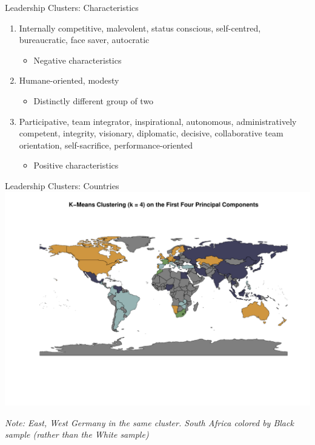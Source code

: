 \documentclass[
  ignorenonframetext,
]{beamer}
\providecommand{\tightlist}{%
  \setlength{\itemsep}{0pt}\setlength{\parskip}{0pt}}
\begin{document}
\begin{frame}{Leadership Clusters: Characteristics}
\protect\hypertarget{leadership-clusters-characteristics-1}{}

\begin{enumerate}
\item
  \textcolor{clust1}{Internally competitive, malevolent, status conscious, self-centred, bureaucratic, face saver, autocratic}

  \begin{itemize}
  \tightlist
  \item
    Negative characteristics
  \end{itemize}
\item
  \textcolor{clust2}{Humane-oriented, modesty}

  \begin{itemize}
  \tightlist
  \item
    Distinctly different group of two
  \end{itemize}
\item
  \textcolor{clust3}{Participative, team integrator, inspirational, autonomous, administratively competent, integrity, visionary, diplomatic, decisive, collaborative team orientation, self-sacrifice, performance-oriented}

  \begin{itemize}
  \tightlist
  \item
    Positive characteristics
  \end{itemize}
\end{enumerate}
\end{frame}

\begin{frame}{Leadership Clusters: Countries}
\protect\hypertarget{leadership-clusters-countries}{}
\includegraphics{final_slides_files/figure-beamer/kmeans-1.pdf}

\emph{Note: East, West Germany in the same cluster. South Africa colored
by Black sample (rather than the White sample)}
\end{frame}
\end{document}
